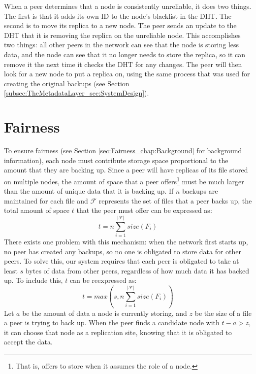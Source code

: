 \documentclass[12pt]{report}
\begin{document}
When a peer determines that a node is consistently unreliable, it does two things. The first is that it adds its own ID to the node's blacklist in the DHT. The second is to move its replica to a new node. The peer sends an update to the DHT that it is removing the replica on the unreliable node. This accomplishes two things: all other peers in the network can see that the node is storing less data, and the node can see that it no longer needs to store the replica, so it can remove it the next time it checks the DHT for any changes. The peer will then look for a new node to put a replica on, using the same process that was used for creating the original backups (see Section \ref{subsec:TheMetadataLayer_sec:SystemDesign}). %

\section{Fairness} \label{sec:Fairness_chap:BTBackup}
To ensure fairness (see Section \ref{sec:Fairness_chap:Background} for background information), each node must contribute storage space proportional to the amount that they are backing up. Since a peer will have replicas of its file stored on multiple nodes, the amount of space that a peer offers\footnote{That is, offers to store when it assumes the role of a node.} must be much larger than the amount of unique data that it is backing up. If $n$ backups are maintained for each file and $\mathcal{F}$ represents the set of files that a peer backs up, the total amount of space $t$ that the peer must offer can be expressed as:
\begin{equation}
t=n\sum\limits_{i=1}^{|\mathcal{F}|} size(F_i)
\end{equation}
There exists one problem with this mechanism: when the network first starts up, no peer has created any backups, so no one is obligated to store data for other peers. To solve this, our system requires that each peer is obligated to take at least $s$ bytes of data from other peers, regardless of how much data it has backed up. To include this, $t$ can be reexpressed as:
\begin{equation}
t=max(s,n\sum\limits_{i=1}^{|\mathcal{F}|} size(F_i))
\end{equation}
Let $a$ be the amount of data a node is currently storing, and $z$ be the size of a file a peer is trying to back up. When the peer finds a candidate node with $t - a > z$, it can choose that node as a replication site, knowing that it is obligated to accept the data.
\end{document}
